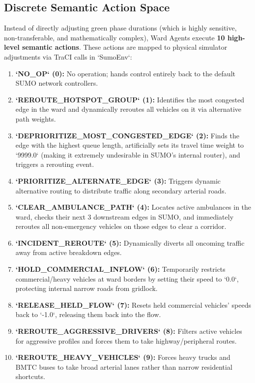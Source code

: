 \documentclass[conference]{IEEEtran}
\begin{document}
\subsection{Discrete Semantic Action Space}
Instead of directly adjusting green phase durations (which is highly sensitive, non-transferable, and mathematically complex), Ward Agents execute \textbf{10 high-level semantic actions}. These actions are mapped to physical simulator adjustments via TraCI calls in `SumoEnv`:
\begin{enumerate}
    \item \textbf{`NO_OP` (0):} No operation; hands control entirely back to the default SUMO network controllers.
    \item \textbf{`REROUTE_HOTSPOT_GROUP` (1):} Identifies the most congested edge in the ward and dynamically reroutes all vehicles on it via alternative path weights.
    \item \textbf{`DEPRIORITIZE_MOST_CONGESTED_EDGE` (2):} Finds the edge with the highest queue length, artificially sets its travel time weight to `9999.0` (making it extremely undesirable in SUMO's internal router), and triggers a rerouting event.
    \item \textbf{`PRIORITIZE_ALTERNATE_EDGE` (3):} Triggers dynamic alternative routing to distribute traffic along secondary arterial roads.
    \item \textbf{`CLEAR_AMBULANCE_PATH` (4):} Locates active ambulances in the ward, checks their next 3 downstream edges in SUMO, and immediately reroutes all non-emergency vehicles on those edges to clear a corridor.
    \item \textbf{`INCIDENT_REROUTE` (5):} Dynamically diverts all oncoming traffic away from active breakdown edges.
    \item \textbf{`HOLD_COMMERCIAL_INFLOW` (6):} Temporarily restricts commercial/heavy vehicles at ward borders by setting their speed to `0.0`, protecting internal narrow roads from gridlock.
    \item \textbf{`RELEASE_HELD_FLOW` (7):} Resets held commercial vehicles' speeds back to `-1.0`, releasing them back into the flow.
    \item \textbf{`REROUTE_AGGRESSIVE_DRIVERS` (8):} Filters active vehicles for aggressive profiles and forces them to take highway/peripheral routes.
    \item \textbf{`REROUTE_HEAVY_VEHICLES` (9):} Forces heavy trucks and BMTC buses to take broad arterial lanes rather than narrow residential shortcuts.
\end{enumerate}
\end{document}
